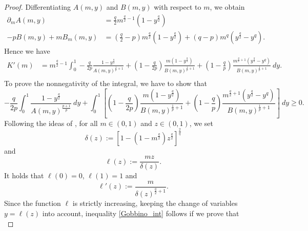 \documentclass{amsart}
\theoremstyle{definition}
\theoremstyle{remark}
\begin{document}
\begin{proof}
Differentiating $A(m,y)$ and $B(m,y)$ with respect to $m$, we obtain
\begin{align*}
\partial_m A(m,y) & =\frac q 2 m^{\frac q2 -1}(1-y^{\frac q2})\\
-pB(m,y)+m B_m(m,y) & =\left(\frac q 2-p\right) m^{\frac q2}(1-y^{\frac q2})+\left(q -p\right) m^{q}(y^{\frac q2}-y^q).
\end{align*}
Hence we have
\begin{equation*}
\begin{split}
K'(m)&= m^{\frac q2-1}\int_0^1 -\frac q {2p} \frac{1-y^{\frac q2}}{A(m,y)^{\frac 1p+1}} +\left(1 -\frac q{2p}\right)\frac{m(1-y^{\frac q2})}{B(m,y)^{\frac 1 p +1}}+\left(1-\frac{q}{p}\right)\frac{m^{\frac q2 +1}(y^{\frac q2}-y^q)}{B(m,y)^{\frac 1 p +1}}\ dy.\\
\end{split}
\end{equation*}
To prove the nonnegativity of the integral, we have to show that
\begin{equation}
\label{Gobbino_int}
-\frac q {2p}\int_0^1 \frac{1-y^{\frac q2}}{A(m,y)^\frac{p+1}{p}}\ dy +
\int_0^1\left[  \left(1 -\frac q{2p}\right)\frac{m(1-y^{\frac q2})}{B(m,y)^{\frac 1 p +1}}+\left(1-\frac{q}{p}\right)\frac{m^{\frac q2 +1}(y^{\frac q2}-y^q)}{B(m,y)^{\frac 1 p +1}}\right]\ dy\ge 0.
\end{equation}
Following the ideas of \cite{GGR}, for all $m\in (0,1)$ and $z\in (0,1)$, we set
\begin{equation*}
\delta (z):=[1-(1-m^{\frac q2})z^{\frac q2}]^\frac{2}{q}
\end{equation*}
and
\begin{equation*}
\ell(z):=\frac{mz}{\delta (z)}.
\end{equation*}
It holds that $\ell (0)=0$, $\ell (1)=1$ and
\[
\ell'(z):=\frac{m}{\delta (z)^{\frac q2+1}}.
\]
Since the function $\ell$ is strictly increasing, keeping the change of variables $y=\ell(z)$ into account, inequality \eqref{Gobbino_int} follows if we prove that
\begin{equation*}

\end{equation*}
\end{proof}
\end{document}

